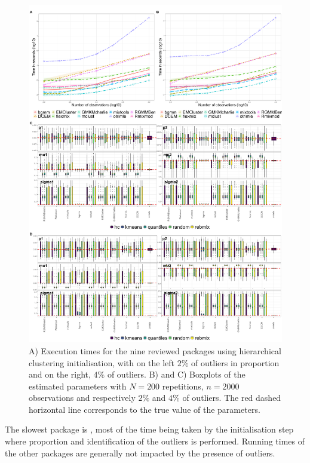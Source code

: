 \begin{figure}[p]
\centering
\includegraphics[width=0.9\linewidth,]{figures/outliers} 
\caption{A) Execution times for the nine reviewed packages using hierarchical clustering initialisation, with on the left $2\%$ of outliers in proportion and on the right, $4\%$ of outliers.  B) and C) Boxplots of the estimated parameters with $N=200$ repetitions, $n=2000$ observations and respectively $2\%$ and $4\%$ of outliers. The red dashed horizontal line corresponds to the true value of the parameters.}
\label{fig:outliers}
\end{figure}

The slowest package is , most of the time being taken by
the initialisation step where proportion and identification of the
outliers is performed. Running times of the other packages are generally
not impacted by the presence of outliers.

